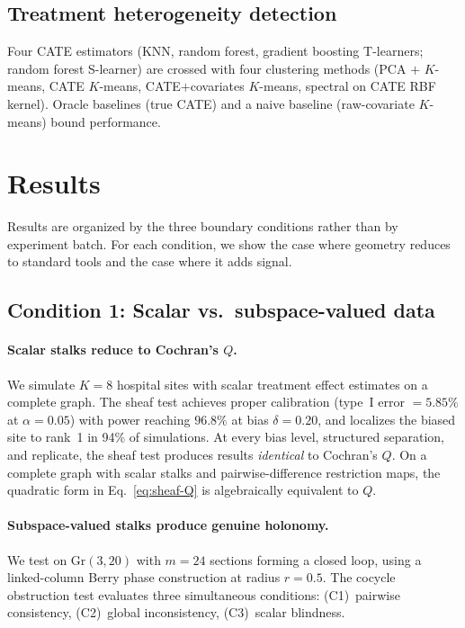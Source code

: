 \documentclass{article}
\newcommand{\Gr}{\mathrm{Gr}}
\begin{document}
\subsection{Treatment heterogeneity detection}
\label{sec:meth-hte}

Four CATE estimators (KNN, random forest, gradient boosting T-learners; random forest S-learner) are crossed with four clustering methods (PCA $+$ $K$-means, CATE $K$-means, CATE$+$covariates $K$-means, spectral on CATE RBF kernel).
Oracle baselines (true CATE) and a naive baseline (raw-covariate $K$-means) bound performance.

\section{Results}
\label{sec:results}

Results are organized by the three boundary conditions rather than by experiment batch.
For each condition, we show the case where geometry reduces to standard tools and the case where it adds signal.

\subsection{Condition 1: Scalar vs.\ subspace-valued data}
\label{sec:ms}
\label{sec:res-scalar-vs-subspace}

\paragraph{Scalar stalks reduce to Cochran's $Q$.}
We simulate $K = 8$ hospital sites with scalar treatment effect estimates on a complete graph.
The sheaf test achieves proper calibration (type~I error $= 5.85\%$ at $\alpha = 0.05$) with power reaching $96.8\%$ at bias $\delta = 0.20$, and localizes the biased site to rank~1 in 94\% of simulations.
At every bias level, structured separation, and replicate, the sheaf test produces results \emph{identical} to Cochran's $Q$.
On a complete graph with scalar stalks and pairwise-difference restriction maps, the quadratic form in Eq.~\eqref{eq:sheaf-Q} is algebraically equivalent to $Q$.

\paragraph{Subspace-valued stalks produce genuine holonomy.}
We test on $\Gr(3, 20)$ with $m = 24$ sections forming a closed loop, using a linked-column Berry phase construction at radius $r = 0.5$.
The cocycle obstruction test evaluates three simultaneous conditions: (C1)~pairwise consistency, (C2)~global inconsistency, (C3)~scalar blindness.
\end{document}
